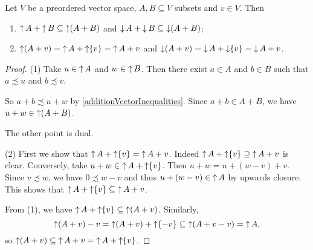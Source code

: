 \begin{lemma} \label{sumUpDownsets}
Let $V$ be a preordered vector space, $A, B\subseteq V$ subsets and $v\in V$. Then
\begin{enumerate}
\item $\upset A + \upset B \subseteq \upset (A + B)$ and $\downset A + \downset B \subseteq \downset(A + B)$;
\item $\upset (A+v) = \upset A + \upset\{v\} = \upset A + v$ and $\downset (A+v) = \downset A + \downset \{v\} = \downset A + v$.
\end{enumerate}
\end{lemma}
\begin{proof}
(1) Take $u\in \upset A$ and $w\in \upset B$. Then there exist $a\in A$ and $b\in B$ such that $a\precsim u$ and $b\precsim v$.

So $a+b \precsim u+w$ by \ref{additionVectorInequalities}. Since $a+b \in A+B$, we have $u+w\in \upset(A+B)$.

The other point is dual.

(2) First we show that $\upset A + \upset\{v\} = \upset A + v$. Indeed $\upset A + \upset \{v\} \supseteq \upset A + v$ is clear. Conversely, take $u + w \in \upset A + \upset\{v\}$. Then $u+ w = u + (w-v) + v$. Since $v\precsim w$, we have $0\precsim w-v$ and thus $u + (w-v)\in \upset A$ by upwards closure. This shows that $\upset A + \upset \{v\} \subseteq \upset A + v$.

From (1), we have $\upset A + \upset\{v\} \subseteq \upset(A+ v)$. Similarly,
\[ \upset (A+v) - v = \upset (A+v) + \upset\{-v\} \subseteq \upset(A+v - v) = \upset A, \]
so $\upset (A+v) \subseteq \upset A + v = \upset A + \upset\{v\}$.
\end{proof}



